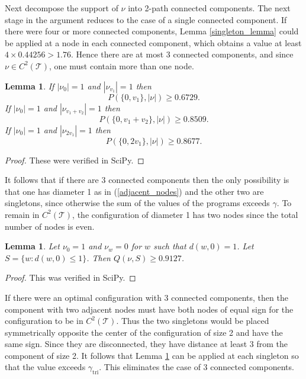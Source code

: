\documentclass[a4paper, 12pt, notitlepage]{amsart}
\newcommand{\tri}{\operatorname{tri}}
\newcommand{\sT}{\mathscr{T}}
\newtheorem{lemma}[theorem]{Lemma}
\theoremstyle{remark}
\begin{document}
Next decompose the support of $\nu$ into 2-path connected components.  The next stage in the argument reduces to the case of a single connected component.  If there were four or more connected components, Lemma \ref{singleton_lemma} could be applied at a node in each connected component,  which obtains a value at least $4 \times 0.44256> 1.76$.  Hence there are at most 3 connected components, and since $\nu \in C^2(\sT)$, one must contain more than one node. 

\begin{lemma}\label{doubles_lemma}
 If $|\nu_0| =1$ and $|\nu_{v_1}| = 1$ then 
 \begin{equation}\label{adjacent_nodes}
P(\{0, v_1\}, |\nu|) \geq 0.6729.
 \end{equation}
 If $|\nu_0| = 1$ and $|\nu_{v_1 + v_2}| = 1$ then 
 \begin{equation}\label{2_adjacent}
P(\{0, v_1 + v_2\}, |\nu|) \geq 0.8509.  
 \end{equation}
 If $|\nu_0| = 1$ and $|\nu_{2v_1}| = 1$ then 
 \begin{equation}\label{2_adjacent_2}
P(\{0, 2v_1\}, |\nu|) \geq 0.8677.
 \end{equation}
\end{lemma}
\begin{proof}
 These were verified in SciPy.
\end{proof}
It follows that if there are 3 connected components then the only possibility is that one has diameter 1 as in (\ref{adjacent_nodes}) and the other two are singletons, since otherwise the sum of the values of the programs exceeds $\gamma$. To remain in $C^2(\sT)$, the configuration of diameter 1 has two nodes since the total number of nodes is even. 
\begin{lemma}\label{singleton_space_lemma}
 Let $\nu_0 = 1$ and $\nu_w = 0$ for $w$ such that $d(w,0) = 1$.  Let $S = \{w : d(w,0)\leq 1\}$.  Then $Q(\nu, S) \geq 0.9127$. 
\end{lemma}

\begin{proof}
 This was verified in SciPy.
\end{proof}
If there were an optimal configuration with 3 connected components, then the component with two adjacent nodes must have both nodes of equal sign for the configuration to be in $C^2(\sT)$. Thus the two singletons would be placed symmetrically opposite the center of the configuration of size 2 and have the same sign.  Since they are disconnected, they have distance at least 3 from the component of size 2.  It follows that Lemma \ref{singleton_space_lemma} can be applied at each singleton so that the value exceeds $\gamma_{\tri}$.  This eliminates the case of 3 connected components.
\end{document}

